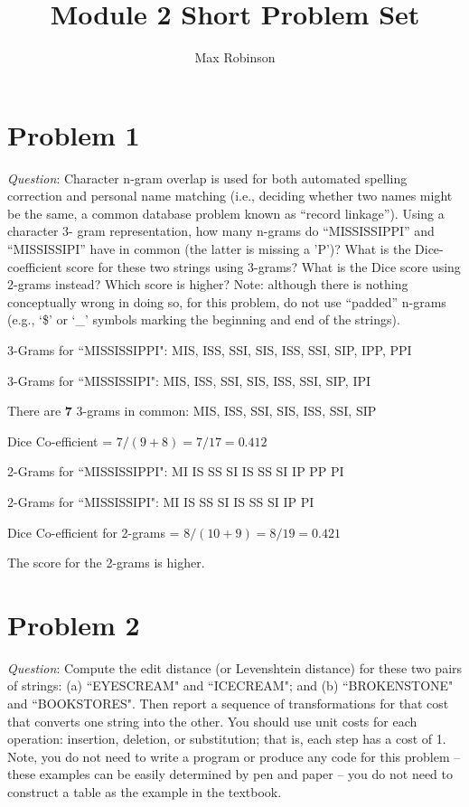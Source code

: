 \documentclass{article}
\begin{document}
\title{Module 2 Short Problem Set}
\author{Max Robinson}
\date{}
\maketitle


\section{Problem 1}
\textit{Question}: Character n-gram overlap is used for both automated spelling correction and personal name matching (i.e.,
deciding whether two names might be the same, a common database problem known as “record linkage”). Using a
character 3- gram representation, how many n-grams do “MISSISSIPPI” and “MISSISSIPI” have in common (the latter
is missing a 'P')? What is the Dice-coefficient score for these two strings using 3-grams? What is the Dice score using
2-grams instead? Which score is higher? Note: although there is nothing conceptually wrong in doing so, for this
problem, do not use “padded” n-grams (e.g., ‘\$’ or ‘\_’ symbols marking the beginning and end of the strings).
\newline 


3-Grams for ``MISSISSIPPI": MIS, ISS, SSI, SIS, ISS, SSI, SIP, IPP, PPI

3-Grams for ``MISSISSIPI": MIS, ISS, SSI, SIS, ISS, SSI, SIP, IPI

There are \textbf{7} 3-grams in common: MIS, ISS, SSI, SIS, ISS, SSI, SIP

Dice Co-efficient = $7/(9+8) = 7/17 = 0.412 $
\newline 

2-Grams for ``MISSISSIPPI": MI IS SS SI IS SS SI IP PP PI

2-Grams for ``MISSISSIPI": MI IS SS SI IS SS SI IP PI

Dice Co-efficient for 2-grams = $8/(10+9) = 8/19 = 0.421$
\newline

The score for the 2-grams is higher. 


\section{Problem 2}
\textit{Question}: Compute the edit distance (or Levenshtein distance) for these two pairs of strings: (a) ``EYESCREAM" and
``ICECREAM"; and (b) ``BROKENSTONE" and ``BOOKSTORES". Then report a sequence of transformations for that
cost that converts one string into the other. You should use unit costs for each operation: insertion, deletion, or
substitution; that is, each step has a cost of 1. Note, you do not need to write a program or produce any code for this
problem – these examples can be easily determined by pen and paper – you do not need to construct a table as the
example in the textbook.
\newline
\pagebreak
\end{document}
